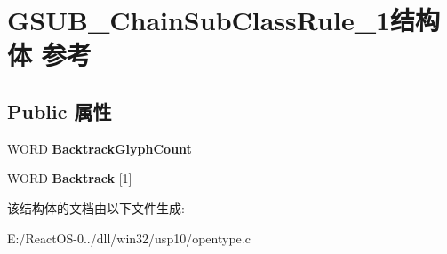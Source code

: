 \hypertarget{struct_g_s_u_b___chain_sub_class_rule__1}{}\section{G\+S\+U\+B\+\_\+\+Chain\+Sub\+Class\+Rule\+\_\+1结构体 参考}
\label{struct_g_s_u_b___chain_sub_class_rule__1}
\subsection*{Public 属性}
\begin{DoxyCompactItemize}
\item 
\mbox{\label{struct_g_s_u_b___chain_sub_class_rule__1_a44450ced06993edc61dd1ac7b07f6403}} 
W\+O\+RD {\bfseries Backtrack\+Glyph\+Count}
\item 
\mbox{\label{struct_g_s_u_b___chain_sub_class_rule__1_ae908910f1b529bcc0da7b2d41269bba1}} 
W\+O\+RD {\bfseries Backtrack} \mbox{[}1\mbox{]}
\end{DoxyCompactItemize}


该结构体的文档由以下文件生成\+:\begin{DoxyCompactItemize}
\item 
E\+:/\+React\+O\+S-\/0../dll/win32/usp10/opentype.\+c\end{DoxyCompactItemize}
